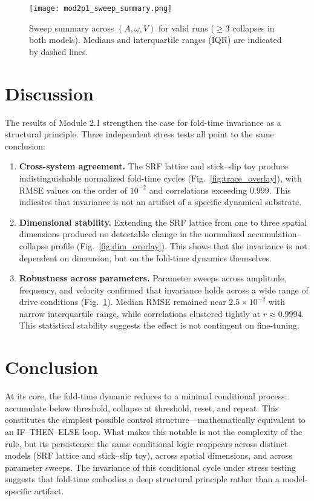 \documentclass[12pt]{article}
\begin{document}
\begin{figure}[htbp]
  \centering
  \texttt{[image: mod2p1\_sweep\_summary.png]}
  \caption{Sweep summary across $(A,\omega,V)$ for valid runs ($\geq 3$ collapses in both models).
  Medians and interquartile ranges (IQR) are indicated by dashed lines.}
  \label{fig:sweep_summary}
\end{figure}
\FloatBarrier

\section{Discussion}

The results of Module 2.1 strengthen the case for fold-time invariance as a
structural principle. Three independent stress tests all point to the same conclusion:

\begin{enumerate}
  \item \textbf{Cross-system agreement.} The SRF lattice and stick--slip toy
  produce indistinguishable normalized fold-time cycles (Fig.~\ref{fig:trace_overlay}),
  with RMSE values on the order of $10^{-2}$ and correlations exceeding $0.999$.
  This indicates that invariance is not an artifact of a specific dynamical substrate.

  \item \textbf{Dimensional stability.} Extending the SRF lattice from one to
  three spatial dimensions produced no detectable change in the normalized
  accumulation--collapse profile (Fig.~\ref{fig:dim_overlay}).
  This shows that the invariance is not dependent on dimension, but on the fold-time
  dynamics themselves.

  \item \textbf{Robustness across parameters.} Parameter sweeps across amplitude,
  frequency, and velocity confirmed that invariance holds across a wide range of
  drive conditions (Fig.~\ref{fig:sweep_summary}). Median RMSE remained near
  $2.5 \times 10^{-2}$ with narrow interquartile range, while correlations clustered
  tightly at $r \approx 0.9994$. This statistical stability suggests the effect is
  not contingent on fine-tuning.
\end{enumerate}
\section{Conclusion}
At its core, the fold-time dynamic reduces to a minimal conditional process:
accumulate below threshold, collapse at threshold, reset, and repeat.
This constitutes the simplest possible control structure—mathematically
equivalent to an IF–THEN–ELSE loop. What makes this notable is not the
complexity of the rule, but its persistence: the same conditional logic
reappears across distinct models (SRF lattice and stick–slip toy), across
spatial dimensions, and across parameter sweeps. The invariance of this
conditional cycle under stress testing suggests that fold-time embodies a
deep structural principle rather than a model-specific artifact.
\end{document}
